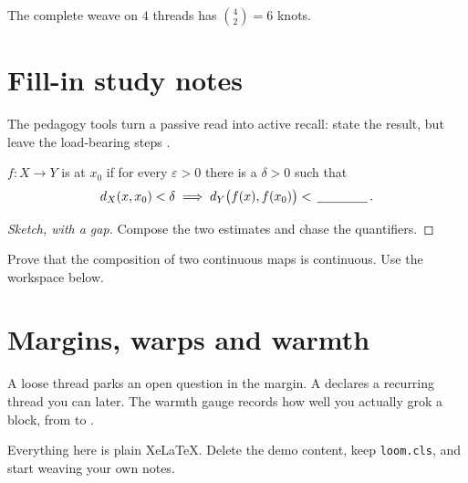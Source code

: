 \documentclass[cjk]{loom}
\begin{document}
\begin{example}
The complete weave on $4$ threads has $\binom{4}{2}=6$ knots.
\end{example}

\section{Fill-in study notes}

The pedagogy tools turn a passive read into active recall: state the result, but
leave the load-bearing steps .

\begin{definition}
$f\colon X\to Y$ is  at $x_0$ if for every
$\varepsilon>0$ there is a $\delta>0$ such that
\[ d_X(x,x_0)<\delta \implies d_Y\big(f(x),f(x_0)\big) < \fillin[1.4cm]. \]
\end{definition}

\begin{proof}[Sketch, with a gap]
Compose the two estimates and chase the quantifiers.
\end{proof}


\begin{yourturn}
Prove that the composition of two continuous maps is continuous. Use the
workspace below.
\end{yourturn}
\workspace[3]

\section{Margins, warps and warmth}

A  loose thread parks an open question in the
margin. A  declares a recurring thread you can 
later. The warmth gauge  records how well you actually grok a block,
from  to .

\begin{remark}
Everything here is plain XeLaTeX. Delete the demo content, keep
\texttt{loom.cls}, and start weaving your own notes.
\end{remark}
\end{document}
